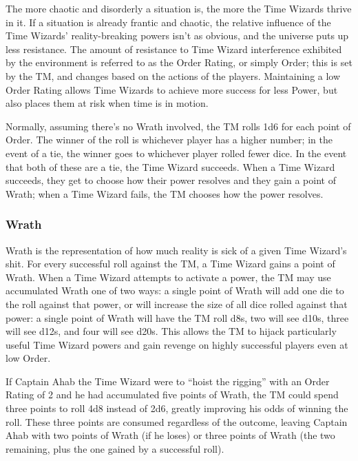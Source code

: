\documentclass[twoside]{article}
\begin{document}
The more chaotic and disorderly a situation is, the more the Time Wizards thrive in it. If a
situation is already frantic and chaotic, the relative influence of the Time Wizards'
reality-breaking powers isn't as obvious, and the universe puts up less resistance. The amount
of resistance to Time Wizard interference exhibited by the environment is referred to as the
Order Rating, or simply Order; this is set by the TM, and changes based on the actions of the
players. Maintaining a low Order Rating allows Time Wizards to achieve more success for less
Power, but also places them at risk when time is in motion.

Normally, assuming there's no Wrath involved, the TM rolls 1d6 for each point of Order. The
winner of the roll is whichever player has a higher number; in the event of a tie, the winner
goes to whichever player rolled fewer dice. In the event that both of these are a tie, the
Time Wizard succeeds. When a Time Wizard succeeds, they get to choose how their power resolves
and they gain a point of Wrath; when a Time Wizard fails, the TM chooses how the power resolves.

\subsubsection{Wrath} \label{sssec:wrath}
Wrath is the representation of how much reality is sick of a given Time Wizard's shit. For
every successful roll against the TM, a Time Wizard gains a point of Wrath. When a Time Wizard
attempts to activate a power, the TM may use accumulated Wrath one of two ways: a single point
of Wrath will add one die to the roll against that power, or will increase the size of all dice
rolled against that power: a single point of Wrath will have the TM roll d8s, two will see
d10s, three will see d12s, and four will see d20s. This allows the TM to hijack particularly
useful Time Wizard powers and gain revenge on highly successful players even at low Order.

If Captain Ahab the Time Wizard were to ``hoist the rigging'' with an Order Rating of 2 and he
had accumulated five points of Wrath, the TM could spend three points to roll 4d8 instead of
2d6, greatly improving his odds of winning the roll. These three points are consumed regardless
of the outcome, leaving Captain Ahab with two points of Wrath (if he loses) or three points of
Wrath (the two remaining, plus the one gained by a successful roll).
\end{document}
